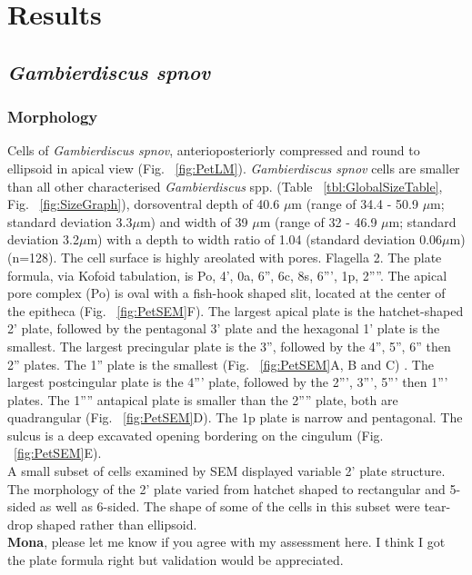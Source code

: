 \documentclass[12pt]{article}
\begin{document}
\newpage
\section{Results}

\subsection{\emph{Gambierdiscus spnov}}
\subsubsection{Morphology}
Cells of \emph{Gambierdiscus spnov}, anterioposteriorly compressed and round to ellipsoid in apical view (Fig. ~\ref{fig:PetLM}). \emph{Gambierdiscus spnov} cells are smaller than all other characterised \emph{Gambierdiscus} spp. (Table ~\ref{tbl:GlobalSizeTable}, Fig. ~\ref{fig:SizeGraph}), dorsoventral depth of 40.6 $\mu$m (range of 34.4 - 50.9 $\mu$m; standard deviation 3.3$\mu$m) and width of 39 $\mu$m (range of 32 - 46.9 $\mu$m; standard deviation 3.2$\mu$m) with a depth to width ratio of 1.04 (standard deviation 0.06$\mu$m)  (n=128). The cell surface is highly areolated with pores. Flagella 2. The plate formula, via Kofoid tabulation, is Po, 4', 0a, 6'', 6c, 8s, 6''', 1p, 2''''. 
The apical pore complex (Po) is oval with a fish-hook shaped slit, located at the center of the epitheca (Fig. ~\ref{fig:PetSEM}F). The largest apical plate is the hatchet-shaped 2' plate, followed by the pentagonal 3' plate and the hexagonal 1' plate is the smallest. The largest precingular plate is the 3'', followed by the 4'', 5'', 6'' then 2'' plates. The 1'' plate is the smallest (Fig. ~\ref{fig:PetSEM}A, B and C) . The largest postcingular plate is the 4''' plate, followed by the 2''', 3''', 5''' then 1''' plates. The 1'''' antapical plate is smaller than the 2'''' plate, both are quadrangular (Fig. ~\ref{fig:PetSEM}D). The 1p plate is narrow and pentagonal. The sulcus is a deep excavated opening bordering on the cingulum (Fig. ~\ref{fig:PetSEM}E).\\
A small subset of cells examined by SEM displayed variable 2' plate structure. The morphology of the 2' plate varied from hatchet shaped to rectangular and 5-sided as well as 6-sided. The shape of some of the cells in this subset were tear-drop shaped rather than ellipsoid. \\
\textbf{Mona}, please let me know if you agree with my assessment here. I think I got the plate formula right but validation would be appreciated.
\end{document}
